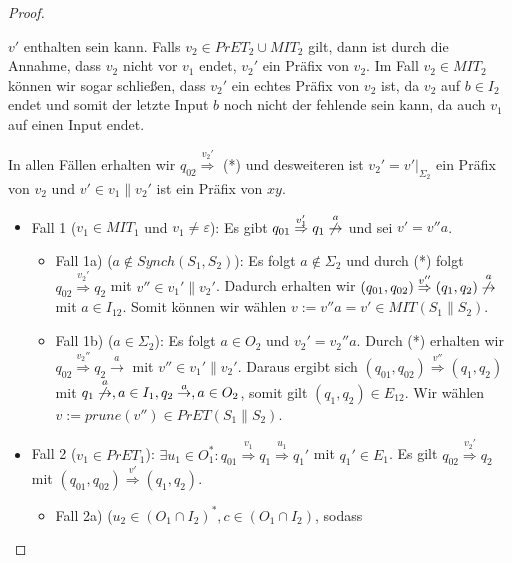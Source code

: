 \begin{proof}
\begin{itemize}
      $v'$ enthalten sein kann. Falls $v_2\in
      PrET_2\cup MIT_2$ gilt, dann ist durch die Annahme, dass $v_2$ nicht vor
      $v_1$ endet, $v_2'$ ein Präfix von $v_2$. Im Fall $v_2\in MIT_2$ können
      wir sogar schließen, dass $v_2'$ ein echtes Präfix von $v_2$ ist, da
      $v_2$ auf $b\in I_2$ endet und somit der letzte Input $b$ noch nicht der
      fehlende sein kann, da auch $v_1$ auf einen Input endet.
  \end{itemize}
  In allen Fällen erhalten wir $q_{02}\overset{v_2'}{\Rightarrow}$ (*) und
  desweiteren ist $v_2'=v'|_{\Sigma _2}$ ein Präfix von $v_2$ und $v'\in v_1\|
  v_2'$ ist ein Präfix von $xy$.
  \begin{itemize}
    \item Fall 1 ($v_1\in MIT_1$ und $v_1\neq\varepsilon$): Es gibt $q_{01}
      \overset{v_1'}{\Rightarrow}q_1
      \overset{a}{\not{\hspace{-0.1cm}\rightarrow}}$ und sei $v'=v''a$.
      \begin{itemize}
        \item Fall 1a) ($a\notin Synch(S_1,S_2)$): Es folgt $a\notin
          \Sigma _2$ und durch (*) folgt $q_{02} \overset{v_2'}{\Rightarrow}
          q_2$ mit $v''\in v_1'\|v_2'$. Dadurch erhalten
          wir $(q_{01},q_{02}) \overset{v''}{\Rightarrow} (q_1,q_2)
          \overset{a}{\not{\hspace{-0.1cm}\rightarrow}}$ mit $a\in I_{12}$.
          Somit können wir wählen $v:=v''a=v'\in MIT(S_1\|S_2)$.
        \item Fall 1b) ($a\in\Sigma _2$): Es folgt $a\in O_2$ und
          $v_2'=v_2''a$. Durch (*) erhalten wir $q_{02}
          \overset{v_2''}{\Rightarrow} q_2 \overset{a}{\rightarrow}$ mit
          $v''\in v_1'\|v_2'$. Daraus ergibt sich $(q_{01},q_{02})
          \overset{v''}{\Rightarrow} (q_1,q_2)$ mit $q_1
          \overset{a}{\not{\hspace{-0.1cm}\rightarrow}},a\in I_1, q_2
          \overset{a}{\rightarrow},a\in O_2$, somit gilt $(q_1,q_2)\in
          E_{12}$. Wir wählen $v:=prune(v'')\in PrET(S_1\|S_2)$.
      \end{itemize}
  \item Fall 2 ($v_1\in PrET_1$): $\exists u_1\in O_1^*:q_{01}
    \overset{v_1}{\Rightarrow} q_1 \overset{u_1}{\Rightarrow} q_1'$ mit
    $q_1'\in E_1$. Es gilt $q_{02} \overset{v_2'}{\Rightarrow}q_2$ mit
    $(q_{01},q_{02}) \overset{v'}{\Rightarrow}(q_1,q_2)$.
    \begin{itemize}
      \item Fall 2a) ($u_2\in (O_1\cap I_2)^*, c\in (O_1\cap I_2)$, sodass

\end{itemize}
\end{itemize}
\end{proof}
